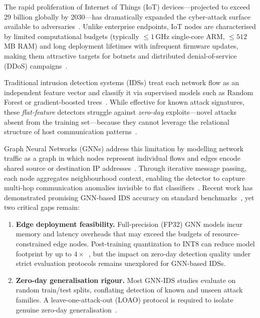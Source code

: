 \documentclass[conference]{IEEEtran}
\begin{document}
The rapid proliferation of Internet of Things (IoT) devices---projected to
exceed 29 billion globally by 2030---has dramatically expanded the cyber-attack
surface available to adversaries~\cite{lo2022survey}.  Unlike enterprise
endpoints, IoT nodes are characterised by limited computational budgets
(typically ${\le}1$\,GHz single-core ARM, ${\le}512$\,MB RAM) and long
deployment lifetimes with infrequent firmware updates, making them attractive
targets for botnets and distributed denial-of-service (DDoS)
campaigns~\cite{meidan2018nbaiot, doshi2018machine}.

Traditional intrusion detection systems (IDSs) treat each network flow as an
independent feature vector and classify it via supervised models such as Random
Forest or gradient-boosted trees~\cite{moustafa2015unsw}.  While effective for
known attack signatures, these \emph{flat-feature} detectors struggle against
\emph{zero-day} exploits---novel attacks absent from the training set---because
they cannot leverage the relational structure of host communication
patterns~\cite{verma2019iot}.

Graph Neural Networks (GNNs) address this limitation by modelling network
traffic as a graph in which nodes represent individual flows and edges encode
shared source or destination IP addresses~\cite{kipf2017semi,
hamilton2017inductive}.  Through iterative message passing, each node aggregates
neighbourhood context, enabling the detector to capture multi-hop communication
anomalies invisible to flat classifiers~\cite{zhou2020graph, velickovic2018graph,
xu2019powerful}.  Recent work has demonstrated promising GNN-based IDS accuracy
on standard benchmarks~\cite{chang2021graph, pujol2022unveiling}, yet two
critical gaps remain:

\begin{enumerate}
  \item \textbf{Edge deployment feasibility.}  Full-precision (FP32) GNN models
        incur memory and latency overheads that may exceed the budgets of
        resource-constrained edge nodes.  Post-training quantization to INT8
        can reduce model footprint by up to $4{\times}$~\cite{jacob2018quantization},
        but the impact on zero-day detection quality under strict evaluation
        protocols remains unexplored for GNN-based IDSs.
  \item \textbf{Zero-day generalisation rigour.}  Most GNN-IDS studies evaluate
        on random train/test splits, conflating detection of known and
        unseen attack families.  A leave-one-attack-out (LOAO) protocol is
        required to isolate genuine zero-day generalisation~\cite{koroniotis2019towards}.
\end{enumerate}
\end{document}
